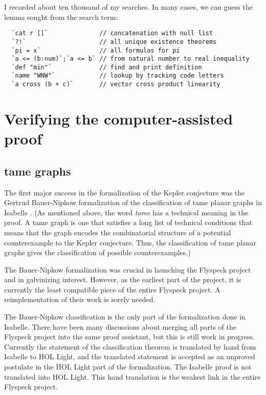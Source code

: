 \documentclass{amsart}
\begin{document}
I recorded about ten thousand of my searches.  In many
cases, we can guess the lemma sought from the search term:

\begin{verbatim}
  `cat r []`              // concatenation with null list
  `?!`                    // all unique existence theorems
  `pi = x`                // all formulas for pi
  `a <= (b:num)`;`a <= b` // from natural number to real inequality
  `def "min"`             // find and print definition
  `name "WNW"`            // lookup by tracking code letters
  `a cross (b + c)`       // vector cross product linearity
\end{verbatim}



\section{Verifying the computer-assisted proof}

\subsection{tame graphs}

The first major success in the formalization of the Kepler conjecture
was the Gertrud Bauer-Nipkow formalization of the classification of
tame planar graphs in Isabelle \cite{DBLP:conf/cade/NipkowBS06}.  (As
mentioned above, the word \emph{tame} has a technical meaning in the
proof.  A tame graph is one that satisfies a long list of technical
conditions that means that the graph encodes the combinatorial
structure of a potential counterexample to the Kepler
conjecture. Thus, the classification of tame planar graphs gives the
classification of possible counterexamples.)

The Bauer-Nipkow formalization was crucial in launching the Flyspeck
project and in galvinizing interest.  However, as the earliest part of
the project, it is currently the least compatible piece of the entire
Flyspeck project.  A reimplementation of their work is sorely needed.

The Bauer-Nipkow classification is the only part of the formalization
done in Isabelle.  There have been many discussions about merging all
parts of the Flyspeck project into the same proof assistant, but this
is still work in progress.  Currently the statement of the
classification theorem is translated by hand from Isabelle to HOL
Light, and the translated statement is accepted as an unproved
postulate in the HOL Light part of the formalization.  The Isabelle
proof is not translated into HOL Light.  This hand translation is the
weakest link in the entire Flyspeck project.
\end{document}
